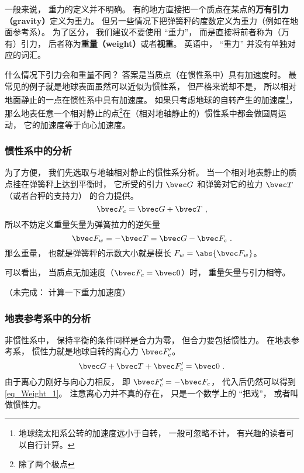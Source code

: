 

一般来说， 重力的定义并不明确。 有的地方直接把一个质点在某点的\textbf{万有引力（gravity）}定义为重力。 但另一些情况下把弹簧秤的度数定义为重力（例如在地面参考系）。 为了区分， 我们建议不要使用 “重力”， 而是直接将前者称为（万有）引力， 后者称为\textbf{重量（weight）}或者\textbf{视重}。 英语中， “重力” 并没有单独对应的词汇。

什么情况下引力会和重量不同？ 答案是当质点（在惯性系中）具有加速度时。 最常见的例子就是地球表面虽然可以近似为惯性系， 但严格来说却不是， 所以相对地面静止的一点在惯性系中具有加速度。 如果只考虑地球的自转产生的加速度\footnote{地球绕太阳系公转的加速度远小于自转， 一般可忽略不计， 有兴趣的读者可以自行计算。}， 那么地表任意一个相对静止的点\footnote{除了两个极点}在（相对地轴静止的）惯性系中都会做圆周运动， 它的加速度等于向心加速度。

\subsubsection{惯性系中的分析}
为了方便， 我们先选取与地轴相对静止的惯性系分析。 当一个相对地表静止的质点挂在弹簧秤上达到平衡时， 它所受的引力 $\bvec G$ 和弹簧对它的拉力 $\bvec T$（或者台秤的支持力） 的合力提供。
\begin{equation}\label{eq_Weight_1}
\bvec F_c = \bvec G + \bvec T~,
\end{equation}
所以不妨定义重量矢量为弹簧拉力的逆矢量
\begin{equation}
\bvec F_w = -\bvec T = \bvec G - \bvec F_c~.
\end{equation}
那么重量， 也就是弹簧秤的示数大小就是模长 $F_w = \abs{\bvec F_w}$。

可以看出， 当质点无加速度（$\bvec F_c = \bvec 0$）时， 重量矢量与引力相等。

（未完成： 计算一下重力加速度）

\subsubsection{地表参考系中的分析}
非惯性系中， 保持平衡的条件同样是合力为零， 但合力要包括惯性力。 在地表参考系， 惯性力就是地球自转的离心力 $\bvec F'_c$。
\begin{equation}
\bvec G + \bvec T + \bvec F'_c = \bvec 0~.
\end{equation}
由于离心力刚好与向心力相反， 即 $\bvec F'_c = -\bvec F_c$， 代入后仍然可以得到\autoref{eq_Weight_1}。 注意离心力并不真的存在， 只是一个数学上的 “把戏”， 或者叫做惯性力。
